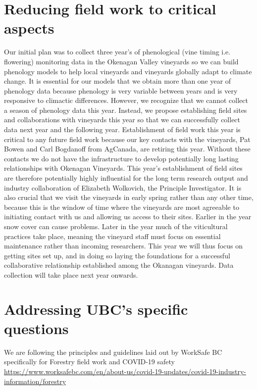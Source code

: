 \documentclass[11pt,letter]{article}
\begin{document}
\section{Reducing field work to critical aspects}
Our initial plan was to collect three year's of phenological (vine timing i.e. flowering) monitoring data in the Okenagan Valley vineyards so we can build phenology models to help local vineyards and vineyards globally adapt to climate change. It is essential for our models that we obtain more than one year of phenology data because phenology is very variable between years and is very responsive to climactic differences. However, we recognize that we cannot collect a season of phenology data this year. Instead, we propose establishing field sites and collaborations with vineyards this year so that we can successfully collect data next year and the following year. Establishment of field work this year is critical to any future field work because our key contacts  with the vineyards, Pat Bowen and Carl Bogdanoff from AgCanada, are retiring this year. Without these contacts we do not have the infrastructure to develop potentially long lasting relationships with Okenagan Vineyards. This year's establishment of field sites are therefore potentially highly influential for the long term research output and industry collaboration of Elizabeth Wolkovich, the Principle Investigator. It is also crucial that we visit the vineyards in early spring rather than any other time, because this is the window of time where the vineyards are most agreeable to initiating contact with us and allowing us access to their sites. Earlier in the year snow cover can cause problems. Later in the year much of the viticultural practices take place, meaning the vineyard staff must focus on essential maintenance rather than incoming researchers. This year we will thus focus on getting sites set up, and in doing so laying the foundations for a successful collaborative relationship established among the Okanagan vineyards. Data collection will take place next year onwards.

\section{Addressing UBC's specific questions}
We are following the principles and guidelines laid out by WorkSafe BC specifically for Forestry field work and COVID-19 safety \url{https://www.worksafebc.com/en/about-us/covid-19-updates/covid-19-industry-information/forestry} \\
\end{document}

